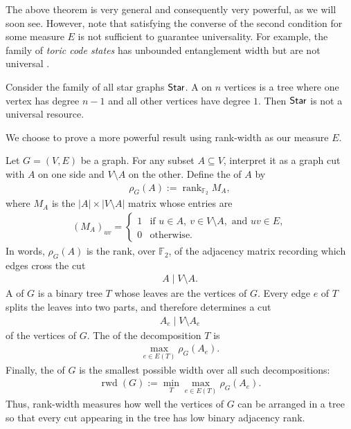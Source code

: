 The above theorem is very general and consequently very powerful, as we will soon see. However, note that satisfying the converse of the second condition for some measure $E$ is not sufficient to guarantee universality. For example, the family of \emph{toric code states} has unbounded entanglement width but are not universal \cite{toric-not-universal}.

\begin{theorem}
\label{thm:star-not-universal}
Consider the family of all star graphs $\mathsf{Star}$. A  on $n$ vertices is a tree where one vertex has degree $n-1$ and all other vertices have degree $1$. Then $\mathsf{Star}$ is not a universal resource.
\end{theorem}

We choose to prove a more powerful result using rank-width as our measure $E$.

\begin{definition}
\label{def:rank-width}
Let $G=(V,E)$ be a graph. For any subset $A \subseteq V$, interpret it as a graph cut with $A$ on one side and $V \setminus A$ on the other. Define
the  of $A$ by
\begin{align}
    \rho_G(A)
    :=
    \operatorname{rank}_{\mathbb F_2}
    M_A,
\end{align}
where $M_A$ is the $|A| \times |V \setminus A|$ matrix whose entries are
\begin{align}
    (M_A)_{uv}
    =
    \begin{cases}
        1 & \text{if } u \in A,\ v \in V \setminus A,\text{ and } uv \in E,\\
        0 & \text{otherwise.}
    \end{cases}
\end{align}
In words, $\rho_G(A)$ is the rank, over $\mathbb F_2$, of the adjacency
matrix recording which edges cross the cut
\begin{align}
    A \mid V \setminus A.
\end{align}
A  of $G$ is a binary tree $T$ whose leaves are
the vertices of $G$. Every edge $e$ of $T$ splits the leaves into two
parts, and therefore determines a cut
\begin{align}
    A_e \mid V \setminus A_e
\end{align}
of the vertices of $G$. The  of the decomposition $T$ is
\begin{align}
    \max_{e \in E(T)} \rho_G(A_e).
\end{align}
Finally, the  of $G$ is the smallest possible width over
all such decompositions:
\begin{align}
    \operatorname{rwd}(G)
    :=
    \min_T \max_{e \in E(T)} \rho_G(A_e).
\end{align}
Thus, rank-width measures how well the vertices of $G$ can be arranged in
a tree so that every cut appearing in the tree has low binary adjacency
rank.
\end{definition}

